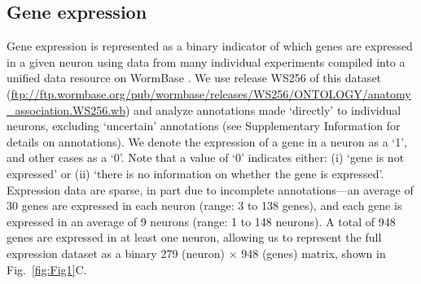 \documentclass[10pt,letterpaper]{article}
\begin{document}
\subsection*{Gene expression}
Gene expression is represented as a binary indicator of which genes are expressed in a given neuron using data from many individual experiments compiled into a unified data resource on WormBase \cite{Harris:2009kd}.
We use release WS256 of this dataset (\url{ftp://ftp.wormbase.org/pub/wormbase/releases/WS256/ONTOLOGY/anatomy_association.WS256.wb}) and analyze annotations made `directly' to individual neurons, excluding `uncertain' annotations (see Supplementary Information for details on annotations).
We denote the expression of a gene in a neuron as a `1', and other cases as a `0'.
Note that a value of `0' indicates either:
(i) `gene is not expressed' or
(ii) `there is no information on whether the gene is expressed'.
Expression data are sparse, in part due to incomplete annotations---an average of 30 genes are expressed in each neuron (range: 3 to 138 genes), and each gene is expressed in an average of 9 neurons (range: 1 to 148 neurons).
A total of 948 genes are expressed in at least one neuron, allowing us to represent the full expression dataset as a binary 279 (neuron) $\times$ 948 (genes) matrix, shown in Fig.~\ref{fig:Fig1}C.
\end{document}
